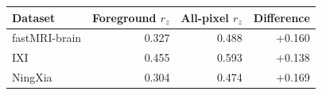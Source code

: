 \begin{tabular}{lrrr}
\toprule
Dataset & Foreground $r_z$ & All-pixel $r_z$ & Difference \\
\midrule
fastMRI-brain & 0.327 & 0.488 & +0.160 \\
IXI & 0.455 & 0.593 & +0.138 \\
NingXia & 0.304 & 0.474 & +0.169 \\
\bottomrule
\end{tabular}
